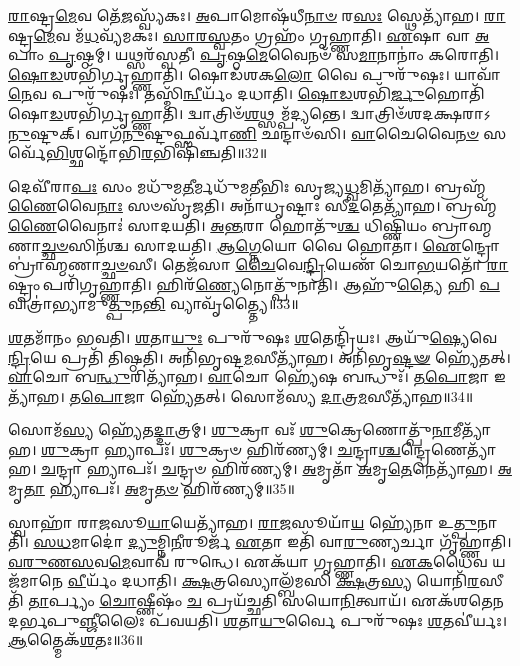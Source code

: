 \-\ul{𑌰𑌾}\-𑌷𑍍𑌟𑍍𑌰\-\ul{𑌮𑍇}\-𑌵 𑌤𑍇᳴\-\ul{𑌜}\-𑌸𑍍𑌵𑍍𑌯᳴𑌕𑌃।
\-\ul{𑌅}\-𑌪𑌾𑌮𑍋𑌷᳴𑌧𑍀\-\ul{𑌨𑌾}\-\-\ul{𑍞} 𑌰\-\ul{𑌸𑌃} 𑌸𑍍𑌥𑍇𑌤𑍍𑌯𑌾᳴𑌹।
\-\ul{𑌰𑌾}\-𑌷𑍍𑌟𑍍𑌰\-\ul{𑌮𑍇}\-𑌵 𑌮᳴\-\ul{𑌧}\-𑌵𑍍𑌯᳴𑌮𑌕𑌃।
\-\ul{𑌸𑌾}\-\-\ul{𑌰}\-\-\ul{𑌸𑍍𑌵}\-𑌤𑌂 𑌗𑍍𑌰𑌹𑌂᳴ 𑌗𑍃𑌹𑍍𑌣𑌾𑌤𑌿।
\-\ul{𑌏}\-𑌷𑌾 𑌵𑌾 \ul{𑌅}\-𑌪𑌾𑌂 \ul{𑌪𑍃}\-𑌷𑍍𑌠𑌮𑍍।
𑌯𑌥𑍍𑌸𑌰᳴𑌸𑍍𑌵𑌤𑍀।
\-\ul{𑌪𑍃}\-𑌷𑍍𑌠\-\ul{𑌮𑍇}\-𑌵𑍈𑌨𑍞᳴ 𑌸\-\ul{𑌮𑌾}\-𑌨𑌾𑌨𑌾𑌂॑ 𑌕𑌰𑍋𑌤𑌿।
\-\ul{𑌷𑍋}\-\-\ul{𑌡}\-𑌶𑌭𑌿᳴𑌰𑍍𑌗𑍃𑌹𑍍𑌣𑌾𑌤𑌿।
𑌷𑍋𑌡᳴𑌶𑌕\-\ul{𑌲𑍋} 𑌵𑍈 𑌪𑍁𑌰𑍁᳴𑌷𑌃।
𑌯𑌾𑌵𑌾᳴\-\ul{𑌨𑍇}\-𑌵 𑌪𑍁𑌰𑍁᳴𑌷𑌃।
𑌤𑌸𑍍𑌮𑌿᳴\-\ul{𑌨𑍍𑌵𑍀}\-𑌰𑍍𑌯𑌂᳴ 𑌦𑌧𑌾𑌤𑌿।
\-\ul{𑌷𑍋}\-\-\ul{𑌡}\-𑌶𑌭𑌿᳴\-\ul{𑌰𑍍𑌜𑍁}\-𑌹𑍋𑌤𑌿᳴ 𑌷𑍋\-\ul{𑌡}\-𑌶𑌭𑌿᳴𑌰𑍍𑌗𑍃𑌹𑍍𑌣𑌾𑌤𑌿।
𑌦𑍍𑌵𑌾𑌤𑍍𑌰𑌿𑍞᳴\-\ul{𑌶}\-𑌥𑍍𑌸𑌮𑍍𑌪᳴𑌦𑍍𑌯𑌨𑍍𑌤𑍇।
𑌦𑍍𑌵𑌾𑌤𑍍𑌰𑌿𑍞᳴𑌶𑌦𑌕𑍍𑌷𑌰𑌾\-𑌽\-\ul{𑌨𑍁}\-𑌷𑍍𑌟𑍁𑌕𑍍।
𑌵𑌾𑌗᳴\-\ul{𑌨𑍁}\-𑌷𑍍𑌟𑍁𑌫𑍍𑌸𑌰𑍍𑌵𑌾᳴\-\ul{𑌣𑌿} 𑌛𑌨𑍍𑌦𑌾𑍞᳴𑌸𑌿।
\-\ul{𑌵𑌾}\-𑌚𑍈𑌵𑍈\-\ul{𑌨}\-\-\ul{𑍞} 𑌸𑌰𑍍𑌵𑍇᳴\-\ul{𑌭𑌿}\-𑌶𑍍𑌛𑌨𑍍𑌦𑍋᳴𑌭𑌿\-\ul{𑌰}\-𑌭𑌿𑌷𑌿᳴𑌞𑍍𑌚𑌤𑌿॥32॥\anuvakamend[\-\ul{𑌊}\-𑌰𑍍𑌮𑌿𑌰𑌿𑌤𑍍𑌯𑌾᳴\-\ul{𑌹} 𑌸𑍂𑌰𑍍𑌯᳴𑌵𑌰𑍍𑌚\-\ul{𑌸𑌃} 𑌸𑍍𑌥𑍇𑌤𑍍𑌯𑌾᳴𑌹 𑌬𑍍𑌰𑌹𑍍𑌮𑌵\-\ul{𑌰𑍍𑌚}\-𑌸𑍍𑌯᳴𑌕𑌸𑍍𑌤𑍇\-\ul{𑌜}\-𑌸𑍍𑌯𑌾𑌃॑ 𑌸𑍍𑌥𑍇𑌤𑍍𑌯𑌾᳴\-\ul{𑌹𑍈}\-𑌵 𑌪𑍁𑌰𑍁᳴\-\ul{𑌷𑌃} 𑌷𑌟𑍍 𑌚᳴]

𑌦𑍇𑌵𑍀᳴𑌰𑌾\-\ul{𑌪𑌃} 𑌸𑌂 𑌮𑌧𑍁᳴𑌮\-\ul{𑌤𑍀}\-𑌰𑍍𑌮𑌧𑍁᳴𑌮𑌤𑍀𑌭𑌿𑌃 𑌸𑍃𑌜𑍍𑌯\-\ul{𑌧𑍍𑌵}\-𑌮𑌿𑌤𑍍𑌯𑌾᳴𑌹।
𑌬𑍍𑌰𑌹𑍍𑌮᳴\-\ul{𑌣𑍈}\-𑌵𑍈\-\ul{𑌨𑌾𑌃} 𑌸𑍞𑌸𑍃᳴𑌜𑌤𑌿।
𑌅𑌨𑌾᳴𑌧𑍃𑌷𑍍𑌟𑌾𑌃 𑌸𑍀\-\ul{𑌦}\-𑌤𑍇𑌤𑍍𑌯𑌾᳴𑌹।
𑌬𑍍𑌰𑌹𑍍𑌮᳴\-\ul{𑌣𑍈}\-𑌵𑍈𑌨𑌾𑌃॑ 𑌸𑌾𑌦𑌯𑌤𑌿।
\-\ul{𑌅}\-\-\ul{𑌨𑍍𑌤}\-𑌰𑌾 𑌹𑍋𑌤𑍁᳴\-\ul{𑌶𑍍𑌚} 𑌧𑌿𑌷𑍍𑌣𑌿᳴𑌯𑌂 𑌬𑍍𑌰𑌾𑌹𑍍𑌮𑌣𑌾\-\ul{𑌚𑍍𑌛}\-\-\ul{𑍞}\-𑌸𑌿𑌨᳴𑌶𑍍𑌚 𑌸𑌾𑌦𑌯𑌤𑌿।
\-\ul{𑌆}\-\-\ul{𑌗𑍍𑌨𑍇}\-𑌯𑍋 𑌵𑍈 𑌹𑍋𑌤𑌾॑।
\-\ul{𑌐}\-𑌨𑍍𑌦𑍍𑌰𑍋 𑌬𑍍𑌰𑌾॑𑌹𑍍𑌮𑌣𑌾\-\ul{𑌚𑍍𑌛}\-\-\ul{𑍞}\-𑌸𑍀।
𑌤𑍇𑌜᳴𑌸𑌾 \ul{𑌚𑍈}\-𑌵𑍇\-\ul{𑌨𑍍𑌦𑍍𑌰𑌿}\-𑌯𑍇𑌣᳴ 𑌚𑍋\-\ul{𑌭}\-𑌯𑌤𑍋᳴ \ul{𑌰𑌾}\-𑌷𑍍𑌟𑍍𑌰𑌂 𑌪𑌰𑌿᳴𑌗𑍃𑌹𑍍𑌣𑌾𑌤𑌿।
𑌹𑌿𑌰᳴\-\ul{𑌣𑍍𑌯𑍇}\-𑌨𑍋𑌤𑍍𑌪𑍁᳴𑌨𑌾𑌤𑌿।
𑌆𑌹𑍁᳴\-\ul{𑌤𑍍𑌯𑍈} 𑌹𑌿 \ul{𑌪}\-𑌵𑌿𑌤𑍍𑌰𑌾॑𑌭𑍍𑌯𑌾𑌮𑍁\-\ul{𑌤𑍍𑌪𑍁}\-𑌨\-\ul{𑌨𑍍𑌤𑌿} 𑌵𑍍𑌯𑌾𑌵𑍃᳴𑌤𑍍𑌤𑍍𑌯𑍈॥33॥

\-\ul{𑌶}\-𑌤𑌮𑌾᳴𑌨𑌂 𑌭𑌵𑌤𑌿।
\-\ul{𑌶}\-𑌤𑌾\-\ul{𑌯𑍁𑌃} 𑌪𑍁𑌰𑍁᳴𑌷𑌃 \ul{𑌶}\-𑌤𑍇𑌨𑍍𑌦𑍍𑌰𑌿᳴𑌯𑌃।
𑌆𑌯𑍁᳴\-\ul{𑌷𑍍𑌯𑍇}\-𑌵𑍇\-\ul{𑌨𑍍𑌦𑍍𑌰𑌿}\-𑌯𑍇 𑌪𑍍𑌰𑌤𑌿᳴ 𑌤𑌿𑌷𑍍𑌠𑌤𑌿।
𑌅𑌨𑌿᳴𑌭𑍃𑌷𑍍𑌟\-\ul{𑌮}\-𑌸𑍀𑌤𑍍𑌯𑌾᳴𑌹।
𑌅𑌨𑌿᳴𑌭𑍃\-\ul{𑌷𑍍𑌟}\-\-\ul{𑍟} 𑌹𑍍𑌯𑍇᳴𑌤𑌤𑍍।
\-\ul{𑌵𑌾}\-𑌚𑍋 𑌬\-\ul{𑌨𑍍𑌧𑍁}\-𑌰𑌿𑌤𑍍𑌯𑌾᳴𑌹।
\-\ul{𑌵𑌾}\-𑌚𑍋 𑌹𑍍𑌯𑍇᳴𑌷 𑌬𑌨𑍍𑌧𑍁𑌃᳴।
\-\ul{𑌤}\-\-\ul{𑌪𑍋}\-𑌜𑌾 𑌇𑌤𑍍𑌯𑌾᳴𑌹।
\-\ul{𑌤}\-\-\ul{𑌪𑍋}\-𑌜𑌾 𑌹𑍍𑌯𑍇᳴𑌤𑌤𑍍।
𑌸𑍋𑌮᳴𑌸𑍍𑌯 \ul{𑌦𑌾}\-𑌤𑍍𑌰\-\ul{𑌮}\-𑌸𑍀𑌤𑍍𑌯𑌾᳴𑌹॥34॥

𑌸𑍋𑌮᳴\-\ul{𑌸𑍍𑌯} 𑌹𑍍𑌯𑍇᳴𑌤\-\ul{𑌦𑍍𑌦𑌾}\-𑌤𑍍𑌰𑌮𑍍।
\-\ul{𑌶𑍁}\-𑌕𑍍𑌰𑌾 𑌵𑌃᳴ \ul{𑌶𑍁}\-𑌕𑍍𑌰𑍇𑌣𑍋𑌤𑍍𑌪𑍁᳴\-\ul{𑌨𑌾}\-𑌮𑍀𑌤𑍍𑌯𑌾᳴𑌹।
\-\ul{𑌶𑍁}\-𑌕𑍍𑌰𑌾 𑌹𑍍𑌯𑌾𑌪𑌃᳴।
\-\ul{𑌶𑍁}\-𑌕𑍍𑌰𑍞 𑌹𑌿𑌰᳴𑌣𑍍𑌯𑌮𑍍।
\-\ul{𑌚}\-𑌨𑍍𑌦𑍍𑌰𑌾\-\ul{𑌶𑍍𑌚}\-𑌨𑍍𑌦𑍍𑌰𑍇𑌣𑍇𑌤𑍍𑌯𑌾᳴𑌹।
\-\ul{𑌚}\-𑌨𑍍𑌦𑍍𑌰𑌾 𑌹𑍍𑌯𑌾𑌪𑌃᳴।
\-\ul{𑌚}\-𑌨𑍍𑌦𑍍𑌰𑍞 𑌹𑌿𑌰᳴𑌣𑍍𑌯𑌮𑍍।
\-\ul{𑌅}\-𑌮𑍃𑌤𑌾᳴ \ul{𑌅}\-𑌮𑍃\-\ul{𑌤𑍇}\-𑌨𑍇𑌤𑍍𑌯𑌾᳴𑌹।
\-\ul{𑌅}\-𑌮𑍃\-\ul{𑌤𑌾} 𑌹𑍍𑌯𑌾𑌪𑌃᳴।
\-\ul{𑌅}\-𑌮𑍃\-\ul{𑌤}\-\-\ul{𑍞} 𑌹𑌿𑌰᳴𑌣𑍍𑌯𑌮𑍍॥35॥

𑌸𑍍𑌵𑌾𑌹𑌾᳴ 𑌰𑌾\-\ul{𑌜}\-𑌸𑍂\-\ul{𑌯𑌾}\-𑌯𑍇𑌤𑍍𑌯𑌾᳴𑌹।
\-\ul{𑌰𑌾}\-\-\ul{𑌜}\-𑌸𑍂𑌯𑌾᳴\-\ul{𑌯} 𑌹𑍍𑌯𑍇᳴𑌨𑌾 𑌉\-\ul{𑌤𑍍𑌪𑍁}\-𑌨𑌾𑌤𑌿᳴।
\-\ul{𑌸}\-\-\ul{𑌧}\-𑌮𑌾𑌦𑍋॑ \ul{𑌦𑍍𑌯𑍁}\-𑌮𑍍𑌨𑌿\-\ul{𑌨𑍀}\-𑌰𑍂𑌰𑍍𑌜᳴ \ul{𑌏}\-𑌤𑌾 𑌇𑌤𑌿᳴ 𑌵𑌾\-\ul{𑌰𑍁}\-𑌣𑍍𑌯𑌰𑍍𑌚𑌾 𑌗𑍃᳴𑌹𑍍𑌣𑌾𑌤𑌿।
\-\ul{𑌵}\-\-\ul{𑌰𑍁}\-\-\ul{𑌣}\-\-\ul{𑌸}\-𑌵\-\ul{𑌮𑍇}\-𑌵𑌾𑌵᳴ 𑌰𑍁𑌨𑍍𑌧𑍇।
𑌏𑌕᳴𑌯𑌾 𑌗𑍃𑌹𑍍𑌣𑌾𑌤𑌿।
\-\ul{𑌏}\-\-\ul{𑌕}\-𑌧𑍈𑌵 𑌯𑌜᳴𑌮𑌾𑌨𑍇 \ul{𑌵𑍀}\-𑌰𑍍𑌯𑌂᳴ 𑌦𑌧𑌾𑌤𑌿।
\-\ul{𑌕𑍍𑌷}\-𑌤𑍍𑌰𑌸𑍍𑌯𑍋𑌲𑍍𑌬᳴𑌮𑌸𑌿 \ul{𑌕𑍍𑌷}\-𑌤𑍍𑌰\-\ul{𑌸𑍍𑌯} 𑌯𑍋𑌨𑌿᳴\-\ul{𑌰}\-𑌸𑍀𑌤𑌿᳴ \ul{𑌤𑌾}\-𑌰𑍍𑌪𑍍𑌯𑌂 \ul{𑌚𑍋}\-𑌷𑍍𑌣𑍀𑌷𑌂᳴ \ul{𑌚} 𑌪𑍍𑌰𑌯᳴𑌚𑍍𑌛𑌤𑌿 𑌸𑌯𑍋\-\ul{𑌨𑌿}\-𑌤𑍍𑌵𑌾𑌯᳴।
𑌏𑌕᳴𑌶𑌤𑍇𑌨 𑌦𑌰𑍍𑌭𑌪𑍁\-\ul{𑌞𑍍𑌜𑍀}\-𑌲𑍈𑌃 𑌪᳴𑌵𑌯𑌤𑌿।
\-\ul{𑌶}\-𑌤𑌾\-\ul{𑌯𑍁}\-𑌰𑍍𑌵𑍈 𑌪𑍁𑌰𑍁᳴𑌷𑌃 \ul{𑌶}\-𑌤𑌵𑍀॑𑌰𑍍𑌯𑌃।
\-\ul{𑌆}\-𑌤𑍍𑌮𑍈𑌕᳴\-\ul{𑌶}\-𑌤𑌃॥36॥

